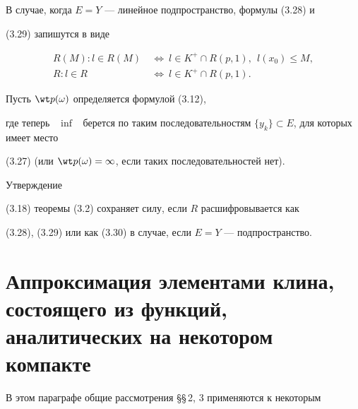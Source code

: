 В случае, когда $E=Y$ --- линейное подпространство, формулы (3.28) и 


(3.29) запишутся в виде


\begin{equation} 


\begin{split} 


R(M):l\in R(M)\ &\Longleftrightarrow \ l\in K^+\cap 


R(p,1),\ \ l(x_0)\le M, \\ 


% 


R:l\in R\ &\Longleftrightarrow\ l\in K^+\cap R(p,1). 


\end{split} 


\end{equation} 


 


\begin{cornonum} 


Пусть $\wt p(\omega)$ определяется формулой (3.12), 


где теперь \ $\inf$ \ берется по таким последовательностям $\{y_k\}\subset 


E$, для которых имеет место 


(3.27) (или $\wt p(\omega)=\infty$, если таких последовательностей нет). 


Утверждение 


(3.18) теоремы (3.2) сохраняет силу, если $R$ расшифровывается как 


(3.28), (3.29) или как (3.30) в случае, если $E=Y$ --- подпространство. 


\end{cornonum} 


 


 


\section{Аппроксимация элементами клина, \protect\\ 


состоящего из функций, аналитических на некотором компакте} 


 


В этом параграфе общие рассмотрения \S\S\,2, 3 применяются к некоторым 



